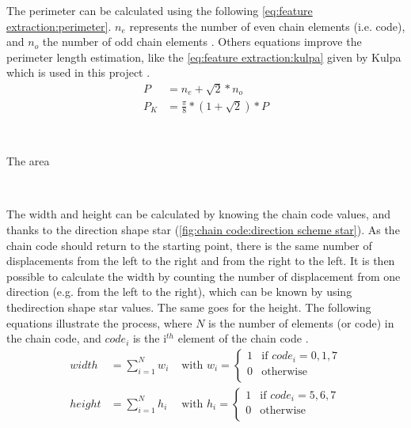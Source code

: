 The perimeter can be calculated using the following \vref{eq:feature extraction:perimeter}. $n_e$ represents the number of even chain elements (i.e. code), and $n_o$ the number of odd chain elements \cite{bib:chain:EstimateAreasAndPerimetersChainCode}. Others equations improve the perimeter length estimation, like the \vref{eq:feature extraction:kulpa} given by Kulpa which is used in this project \cite{bib:chain:ObjectDescription}.
\begin{align} 
P &= n_e + \sqrt{2}*n_o \label{eq:feature extraction:perimeter} \\
P_K &= \frac{\pi}{8} * (1 + \sqrt{2}) * P \label{eq:feature extraction:kulpa}
\end{align}

~~

The area 

~~

The width and height can be calculated by knowing the chain code values, and thanks to the direction shape star (\vref{fig:chain code:direction scheme star}). As the chain code should return to the starting point, there is the same number of displacements from the left to the right and from the right to the left. It is then possible to calculate the width by counting the number of displacement from one direction (e.g. from the left to the right), which can be known by using thedirection shape star values. The same goes for the height. The following equations illustrate the process, where $N$ is the number of elements (or code) in the chain code, and $code_i$ is the i$^{th}$ element of the chain code \cite{bib:chain:ShapeDescription}.
\begin{align}
width &= \sum_{i = 1}^{N} w_i 
& \text{ with } w_i = 
	\begin{cases}
		1 & \text{if } code_i = 0, 1, 7 \\
		0 & \text{otherwise} \\
	\end{cases} \\
height &= \sum_{i = 1}^{N} h_i 
& \text{ with }  h_i = 
	\begin{cases}
		1 & \text{if } code_i = 5, 6, 7 \\
		0 & \text{otherwise} \\
	\end{cases} 
\end{align}


